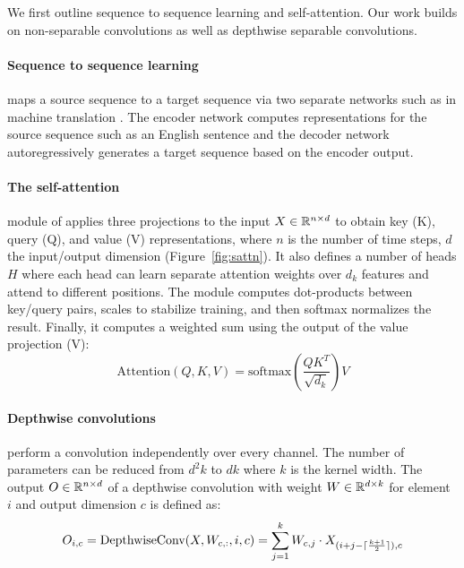 We first outline sequence to sequence learning and self-attention. Our work builds on non-separable convolutions as well as depthwise separable convolutions.

\paragraph{Sequence to sequence learning } maps a source sequence to a target sequence via two separate networks such as in machine translation \citep{sutskever2014sequence}.
The encoder network computes representations for the source sequence such as an English sentence and the decoder network autoregressively generates a target sequence based on the encoder output. 


\paragraph{The self-attention} module of \citet{vaswani2017transformer} applies three projections to the input ${X} \in \mathbb{R}^{n \times d}$ to obtain key (K), query (Q), and value (V) representations, where $n$ is the number of time steps, $d$ the input/output dimension (Figure~\ref{fig:sattn}). 
It also defines a number of heads $H$ where each head can learn separate attention weights over $d_k$ features and attend to different positions.
The module computes dot-products between key/query pairs, scales to stabilize training, and then softmax normalizes the result. 
Finally, it computes a weighted sum using the output of the value projection (V):
\[
\mathrm{Attention}(Q,K,V) = \mathrm{softmax}(\frac{QK^T}{\sqrt{d_k}})V
\]




\paragraph{Depthwise convolutions} perform a convolution independently over every channel. The number of parameters can be reduced from $d^2k$ to $dk$ where $k$ is the kernel width.
The output ${O} \in \mathbb{R}^{n \times d}$ of a depthwise convolution with weight ${W} \in \mathbb{R}^{d \times k}$ for element $i$ and output dimension $c$ is defined as:
\[
{O}_{i, c} = \text{DepthwiseConv}(X, {W}_{c,:}, i, c) = \sum_{j=1}^{k} {W}_{c, j} \cdot {X}_{(i + j - \lceil \frac{k+1}{2} \rceil), c} 
\]



